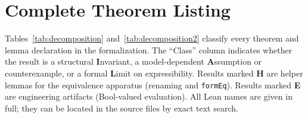 \documentclass[jsl,bibother]{asl}
\theoremstyle{definition}
\theoremstyle{remark}
\begin{document}
\section{Complete Theorem Listing}
\label{app:theorems}

Tables~\ref{tab:decomposition} and~\ref{tab:decomposition2}
classify every theorem and lemma
declaration in the formalization.  The ``Class'' column indicates
whether the result is a structural \textbf{I}nvariant,
a model-dependent \textbf{A}ssumption or counterexample, or a
formal \textbf{L}imit on expressibility.  Results marked
\textbf{H} are helper lemmas for the equivalence apparatus
(renaming and \texttt{formEq}).
Results marked \textbf{E} are engineering artifacts
(Bool-valued evaluation).  All Lean names are given in full;
they can be located in the source files by exact text search.
\end{document}
